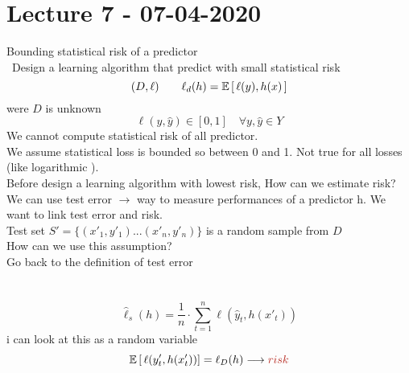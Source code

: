 \documentclass[../main.tex]{subfiles}
\begin{document}
\chapter{Lecture 7 - 07-04-2020}
Bounding statistical risk of a predictor\\\
Design a learning algorithm that predict with small statistical risk\\
$$
(D,\ell) \qquad \ell_d(h) = \mathbb{E}\left[ \, \ell (y), h(x) \, \right]
$$
were $D$ is unknown
$$
\ell(y, \hat{y}) \in [0,1] \quad \forall y, \hat{y} \in Y
$$
We cannot compute statistical risk of all predictor.\\
We assume statistical loss is bounded so between 0 and 1. Not true for all
losses (like logarithmic ).\\
Before design a learning algorithm with lowest risk, How can we estimate
risk?\\
We can use test error $\rightarrow$ way to measure performances of a predictor h.
We want to link test error and risk.
\\
Test set $S' = \{ (x'_1, y'_1) ...(x'_n,y'_n) \}$ is a random sample from $D$
\\
How can we use this assumption?\\
Go back to the definition of test error\\
\\
\\
$$
\hat{\ell}_s(h) = \frac{1}{n} \cdot \sum_{t=1}^{n} \ell (\hat{y}_t,h(x'_t))
$$
i can look at this as a random variable
\\
$$
\barra{E} \left[ \, \ell (y'_t, h(x'_t)) \right] = \ell_D(h) \longrightarrow \red{risk}
$$
\end{document}
